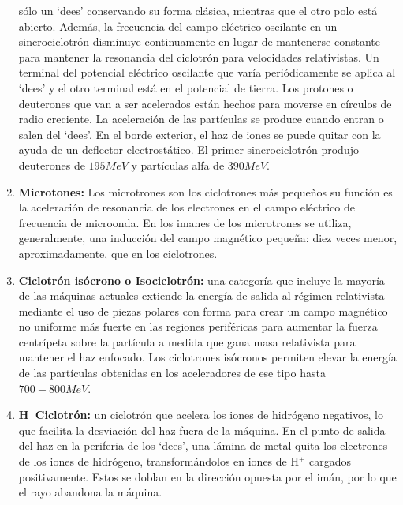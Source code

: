 \documentclass[12pt]{article}
\begin{document}
\begin{enumerate}
					sólo un ‘dees’ conservando su forma clásica, mientras que el otro polo está abierto. Además, la 
					frecuencia del campo eléctrico oscilante en un sincrociclotrón disminuye continuamente en lugar 
					de mantenerse constante para mantener la resonancia del ciclotrón para velocidades relativistas. 
					Un terminal del potencial eléctrico oscilante que varía periódicamente se aplica al ‘dees’ y el otro 
					terminal está en el potencial de tierra. Los protones o deuterones que van a ser acelerados están 
					hechos para moverse en círculos de radio creciente. La aceleración de las partículas se produce 
					cuando entran o salen del ‘dees’. En el borde exterior, el haz de iones se puede quitar con la ayuda 
					de un deflector electrostático. El primer sincrociclotrón produjo deuterones de $ 195 MeV $ y 
					partículas alfa de $ 390 MeV $.\\
					\item \textbf{Microtones:}
					Los microtrones son los ciclotrones más pequeños su función es la aceleración de resonancia de los 
					electrones en el campo eléctrico de frecuencia de microonda. En los imanes de los microtrones se utiliza, 
					generalmente, una inducción del campo magnético pequeña: diez veces menor, aproximadamente, que en los 
					ciclotrones. \\
					\item \textbf{Ciclotrón isócrono o Isociclotrón:}
					una categoría que incluye la mayoría de las máquinas actuales extiende la energía de salida al 
					régimen relativista mediante el uso de piezas polares con forma para crear un campo magnético 
					no uniforme más fuerte en las regiones periféricas para aumentar la fuerza centrípeta sobre la 
					partícula a medida que gana masa relativista para mantener el haz enfocado. Los ciclotrones 
					isócronos permiten elevar la energía de las partículas obtenidas en los aceleradores de ese 
					tipo hasta $ 700-800 MeV $.\\
					\item \textbf{H$^-$Ciclotrón:}
					un ciclotrón que acelera los iones de hidrógeno negativos, lo que facilita la desviación del haz 
					fuera de la máquina. En el punto de salida del haz en la periferia de los ‘dees’, una lámina de metal 
					quita los electrones de los iones de hidrógeno, transformándolos en iones de H$ ^+ $ cargados 
					positivamente. Estos se doblan en la dirección opuesta por el imán, por lo que el rayo abandona la 
					máquina.
				\end{enumerate}
\end{document}

